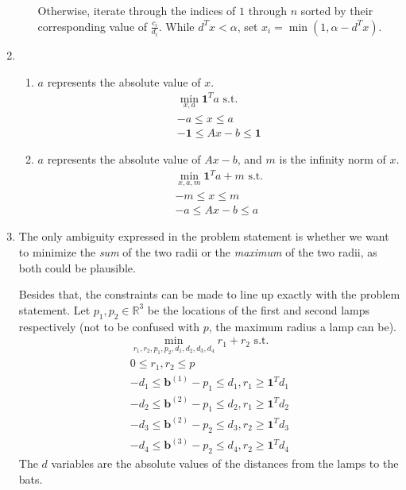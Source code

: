 \documentclass[12pt]{article}
\begin{document}
\begin{enumerate}
\begin{enumerate}[label=\roman*.]
                        Otherwise, iterate through the indices of $1$ through $n$
                        sorted by their corresponding value of $\frac{c_i}{d_i}$.
                        While $d^T x < \alpha$, set $x_i=\min(1, \alpha - d^T x)$.
            \end{enumerate}
      \item \begin{enumerate}
                  \item $a$ represents the absolute value of $x$.
                        \begin{gather*}
                              \min_{x, a} \mathbf{1}^T a\text{ s.t.} \\
                              -a \le x \le a \\
                              -\mathbf{1} \le Ax-b \le \mathbf{1}
                        \end{gather*}
                  \item $a$ represents the absolute value of $Ax-b$, and $m$ is the infinity norm of $x$.
                        \begin{gather*}
                              \min_{x, a, m} \mathbf{1}^T a+m\text{ s.t.} \\
                              -m \le x \le m \\
                              -a \le Ax-b \le a
                        \end{gather*}
            \end{enumerate}
      \item The only ambiguity expressed in the problem statement is whether
            we want to minimize the \textit{sum} of the two radii or the \textit{maximum}
            of the two radii, as both could be plausible.

            Besides that, the constraints can be made to line up exactly with the problem statement.
            Let $p_1, p_2 \in \mathbb{R}^3$ be the locations of the first and second lamps respectively
            (not to be confused with $p$, the maximum radius a lamp can be).
            \begin{gather*}
                  \min_{r_1, r_2, p_1, p_2, d_1, d_2, d_3, d_4} r_1+r_2\text{ s.t.} \\
                  0 \le r_1, r_2 \le p \\
                  -d_1 \le \mathbf{b}^{(1)}-p_1 \le d_1, r_1 \ge \mathbf{1}^T d_1 \\
                  -d_2 \le \mathbf{b}^{(2)}-p_1 \le d_2, r_1 \ge \mathbf{1}^T d_2 \\
                  -d_3 \le \mathbf{b}^{(2)}-p_2 \le d_3, r_2 \ge \mathbf{1}^T d_3 \\
                  -d_4 \le \mathbf{b}^{(3)}-p_2 \le d_4, r_2 \ge \mathbf{1}^T d_4
            \end{gather*}
            The $d$ variables are the absolute values of the distances from the lamps to the bats.
\end{enumerate}
\end{document}
